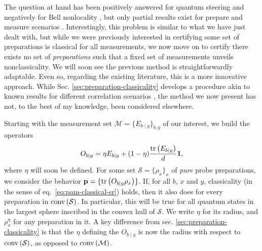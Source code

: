         The question at hand has been positively answered for quantum steering \cite{quintino_incompatibilitysteering_2014,uola_incompatibilitysteering_2014,uola_onetoonesteering_2015} and negatively for Bell nonlocality \cite{quintino_2016_incompatibilitybell,quintino_2018_incompatibilitybellgeneral,bene_2018_incompatibilitybell}, but only partial results exist for prepare and measure scenarios \cite{carmeli_racsincompatibility_2020}. Interestingly, this problem is similar to what we have just dealt with, but while we were previously interested in certifying some set of preparations is classical for all measurements, we now move on to certify there exists no set of \emph{preparations} such that a fixed set of measurements unveils nonclassicality. We will soon see the previous method is straightforwardly adaptable. Even so, regarding the existing literature, this is a more innovative approach. While Sec. \ref{sec:preparation-classicality} develops a procedure akin to known results for different correlation scenarios \cite{cavalcanti_generalmethod_2016,hirsch_algorithmic_2016}, the method we now present has not, to the best of my knowledge, been considered elsewhere.

        \ornamentbreak

        Starting with the measurement set $\mathcal{M} = \{ E_{b \mid y} \}_{b,y}$ of our interest, we build the operators
        \begin{equation}
            O_{b \mid y} = \eta E_{b \mid y} + (1 - \eta)\frac{\text{tr}\left( E_{b \mid y} \right)}{d} \mathbf{1} ,
        \label{eq:polarized-measurements}
        \end{equation}
        where $\eta$ will soon be defined. For some set $\mathcal{S} = \{ \rho_x \}_x$ of \emph{pure} probe preparations, we consider the behavior $\mathbf{p} = \{ \text{tr}\left( O_{b \mid y} \rho_x  \right) \}$. If, for all $b$, $x$ and $y$, classicality (in the sense of eq.~\eqref{eq:pam-classical-sr}) holds, then it also does for every preparation in $\text{conv} \left( \mathcal{S} \right)$. In particular, this will be true for all quantum states in the largest sphere inscribed in the convex hull of $\mathcal{S}$. We write $\eta$ for its radius, and $\rho_x^\eta$ for any preparation in it. A key difference from sec. \ref{sec:preparation-classicality} is that the $\eta$ defining the $O_{b \mid y}$ is now the radius with respect to $\text{conv} \left( \mathcal{S} \right)$, as opposed to $\text{conv} \left( \mathcal{M} \right)$.

